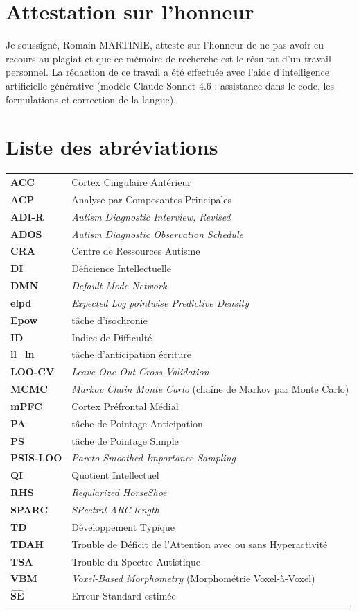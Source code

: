 \documentclass[11pt]{report}
\begin{document}
\chapter*{Attestation sur l'honneur}
Je soussigné, Romain MARTINIE, atteste sur l'honneur de ne pas avoir eu recours au plagiat et que ce mémoire de recherche est le résultat d'un travail personnel. La rédaction de ce travail a été effectuée avec l'aide d'intelligence artificielle générative (modèle Claude Sonnet 4.6 : assistance dans le code, les formulations et correction de la langue).
\newpage


\tableofcontents
\newpage

\chapter*{Liste des abréviations}

\begin{tabular}{>{\bfseries}l l}
	ACC & Cortex Cingulaire Antérieur \\
	ACP & Analyse par Composantes Principales \\
	ADI-R & \textit{Autism Diagnostic Interview, Revised} \\
	ADOS & \textit{Autism Diagnostic Observation Schedule} \\
	CRA & Centre de Ressources Autisme \\
	DI & Déficience Intellectuelle \\
	DMN & \textit{Default Mode Network} \\
	elpd & \textit{Expected Log pointwise Predictive Density} \\
	Epow & tâche d'isochronie \\
	ID & Indice de Difficulté \\
	ll\_ln & tâche d'anticipation écriture \\
	LOO-CV & \textit{Leave-One-Out Cross-Validation} \\
	MCMC & \textit{Markov Chain Monte Carlo} (chaîne de Markov par Monte Carlo) \\
	mPFC & Cortex Préfrontal Médial \\
	PA & tâche de Pointage Anticipation \\
	PS & tâche de Pointage Simple \\
	PSIS-LOO & \textit{Pareto Smoothed Importance Sampling} \\
	QI & Quotient Intellectuel \\
	RHS & \textit{Regularized HorseShoe} \\
	SPARC & \textit{SPectral ARC length} \\
	TD & Développement Typique \\
	TDAH & Trouble de Déficit de l'Attention avec ou sans Hyperactivité \\
	TSA & Trouble du Spectre Autistique \\
	VBM & \textit{Voxel-Based Morphometry} (Morphométrie Voxel-à-Voxel) \\
	$\bm{\widehat{SE}}$ & Erreur Standard estimée \\
\end{tabular}
\end{document}
